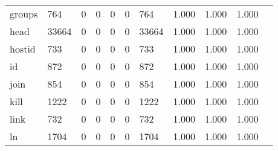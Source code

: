 \begin{longtable}{lp{1.10cm}p{1.10cm}p{1.10cm}p{1.10cm}p{1.10cm}p{1.10cm}p{1.10cm}p{1.10cm}p{1.10cm}p{1.10cm}}
groups    &                    764 &                                  0 &                                 0 &                                0 &                                 0 &                             764 &                          1.000 &                                 1.000 &                               1.000 \\
head      &                  33664 &                                  0 &                                 0 &                                0 &                                 0 &                           33664 &                          1.000 &                                 1.000 &                               1.000 \\
hostid    &                    733 &                                  0 &                                 0 &                                0 &                                 0 &                             733 &                          1.000 &                                 1.000 &                               1.000 \\
id        &                    872 &                                  0 &                                 0 &                                0 &                                 0 &                             872 &                          1.000 &                                 1.000 &                               1.000 \\
join      &                    854 &                                  0 &                                 0 &                                0 &                                 0 &                             854 &                          1.000 &                                 1.000 &                               1.000 \\
kill      &                   1222 &                                  0 &                                 0 &                                0 &                                 0 &                            1222 &                          1.000 &                                 1.000 &                               1.000 \\
link      &                    732 &                                  0 &                                 0 &                                0 &                                 0 &                             732 &                          1.000 &                                 1.000 &                               1.000 \\
ln        &                   1704 &                                  0 &                                 0 &                                0 &                                 0 &                            1704 &                          1.000 &                                 1.000 &                               1.000 \\

\end{longtable}
